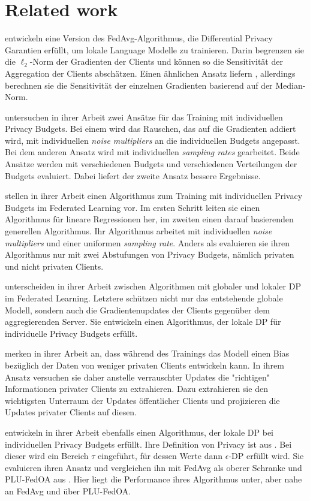 \chapter{Related work}

\textcite{mcmahan:2018} entwickeln eine Version des FedAvg-Algorithmus, die Differential Privacy Garantien erfüllt, um lokale Language Modelle zu trainieren. Darin begrenzen sie die $\ell_2$-Norm der Gradienten der Clients und können so die Sensitivität der Aggregation der Clients abschätzen. Einen ähnlichen Ansatz liefern \textcite{geyer:2017}, allerdings berechnen sie die Sensitivität der einzelnen Gradienten basierend auf der Median-Norm.

\textcite{boenisch:2023} untersuchen in ihrer Arbeit zwei Ansätze für das Training mit individuellen Privacy Budgets. Bei einem wird das Rauschen, das auf die Gradienten addiert wird, mit individuellen \textit{noise multipliers} an die individuellen Budgets angepasst. Bei dem anderen Ansatz wird mit individuellen \textit{sampling rates} gearbeitet. Beide Ansätze werden mit verschiedenen Budgets und verschiedenen Verteilungen der Budgets evaluiert. Dabei liefert der zweite Ansatz bessere Ergebnisse.

\textcite{aldaghri:2023} stellen in ihrer Arbeit einen Algorithmus zum Training mit individuellen Privacy Budgets im Federated Learning vor. Im ersten Schritt leiten sie einen Algorithmus für lineare Regressionen her, im zweiten einen darauf basierenden generellen Algorithmus. Ihr Algorithmus arbeitet mit individuellen \textit{noise multipliers} und einer uniformen \textit{sampling rate}. Anders als \citeauthor{boenisch:2023} evaluieren sie ihren Algorithmus nur mit zwei Abstufungen von Privacy Budgets, nämlich privaten und nicht privaten Clients.

\textcite{yang:2021} unterscheiden in ihrer Arbeit zwischen Algorithmen mit globaler und lokaler DP im Federated Learning. Letztere schützen nicht nur das entstehende globale Modell, sondern auch die Gradientenupdates der Clients gegenüber dem aggregierenden Server. Sie entwickeln einen Algorithmus, der lokale DP für individuelle Privacy Budgets erfüllt.

\textcite{liu:2021} merken in ihrer Arbeit an, dass während des Trainings das Modell einen Bias bezüglich der Daten von weniger privaten Clients entwickeln kann. In ihrem Ansatz versuchen sie daher anstelle verrauschter Updates die "richtigen" Informationen privater Clients zu extrahieren. Dazu extrahieren sie den wichtigsten Unterraum der Updates öffentlicher Clients und projizieren die Updates privater Clients auf diesen.

\textcite{shen:2023} entwickeln in ihrer Arbeit ebenfalls einen Algorithmus, der lokale DP bei individuellen Privacy Budgets erfüllt. Ihre Definition von Privacy ist aus \textcite{chen:2016}. Bei dieser wird ein Bereich $\tau$ eingeführt, für dessen Werte dann $\epsilon$-DP erfüllt wird. Sie evaluieren ihren Ansatz und vergleichen ihn mit FedAvg \parencite{mcmahan:2016} als oberer Schranke und PLU-FedOA aus \textcite{yang:2021}. Hier liegt die Performance ihres Algorithmus unter, aber nahe an FedAvg und über PLU-FedOA.
